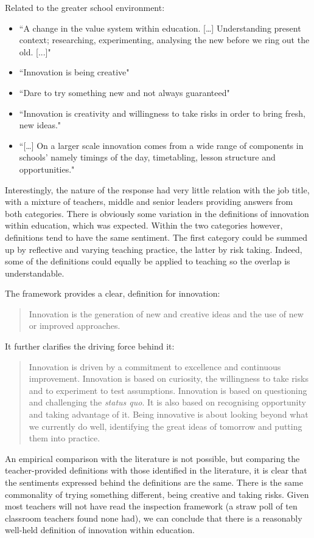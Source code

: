 \documentclass[11pt]{article}
\begin{document}
Related to the greater school environment:
\begin{itemize}
	\item ``A change in the value system within education. […] Understanding present context; researching, experimenting, analysing the new before we ring out the old. [...]"
	\item ``Innovation is being creative"
	\item ``Dare to try something new and not always guaranteed"
	\item ``Innovation is creativity and willingness to take risks in order to bring fresh, new ideas."
	\item ``[…] On a larger scale innovation comes from a wide range of components in schools' namely timings of the day, timetabling, lesson structure and opportunities."
\end{itemize}

Interestingly, the nature of the response had very little relation with the job title, with a mixture of teachers, middle and senior leaders providing answers from both categories. There is obviously some variation in the definitions of innovation within education, which was expected. Within the two categories however, definitions tend to have the same sentiment. The first category could be summed up by reflective and varying teaching practice, the latter by risk taking. Indeed, some of the definitions could equally be applied to teaching so the overlap is understandable.

The framework provides a clear, definition for innovation: \begin{quote}
	Innovation is the generation of new and creative ideas and the use of new or improved approaches. 
\end{quote} \cite[p. 12]{ADEC2016}

It further clarifies the driving force behind it: 
\begin{quote}
	Innovation is driven by a commitment to excellence and continuous improvement. Innovation is based on curiosity, the willingness to take risks and to experiment to test assumptions. Innovation is based on questioning and challenging the \textit{status quo}. It is also based on recognising opportunity and taking advantage of it. Being innovative is about looking beyond what we currently do well, identifying the great ideas of tomorrow and putting them into practice.
\end{quote}

An empirical comparison with the literature is not possible, but comparing the teacher-provided definitions with those identified in the literature, it is clear that the sentiments expressed behind the definitions are the same. There is the same commonality of trying something different, being creative and taking risks. Given most teachers will not have read the inspection framework (a straw poll of ten classroom teachers found none had), we can conclude that there is a reasonably well-held definition of innovation within education.
\end{document}
